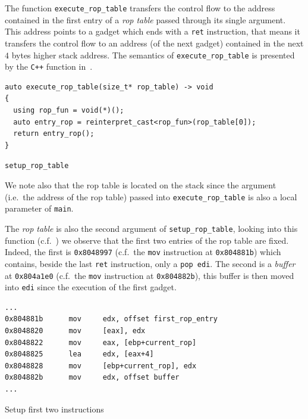 \documentclass{easychair}
\begin{document}
The function \texttt{execute\_rop\_table} transfers the control flow to the address contained in the first entry of a \emph{rop table} passed through its single argument. This address points to a gadget which ends with a \texttt{ret} instruction, that means it transfers the control flow to an address (of the next gadget) contained in the next $4$ bytes higher stack address. The semantics of \texttt{execute\_rop\_table} is presented by the \texttt{C++} function in~.

\begin{listing}[ht]
  \begin{tcolorbox}
\begin{verbatim}
auto execute_rop_table(size_t* rop_table) -> void
{
  using rop_fun = void(*)();
  auto entry_rop = reinterpret_cast<rop_fun>(rop_table[0]);
  return entry_rop();
}
\end{verbatim}
  \end{tcolorbox}
  \caption{\texttt{setup\_rop\_table}}
  \label{lst:setup_rop_table}
\end{listing}

\begin{remark}
  We note also that the rop table is located on the stack since the argument (i.e.~the address of the rop table) passed into \texttt{execute\_rop\_table} is also a local parameter of \texttt{main}.
\end{remark}

The \emph{rop table} is also the second argument of \texttt{setup\_rop\_table}, looking into this function (c.f.~) we observe that the first two entries of the rop table are fixed. Indeed, the first is \texttt{0x8048997} (c.f.~the \texttt{mov} instruction at \texttt{0x804881b}) which contains, beside the last \texttt{ret} instruction, only a \texttt{pop edi}. The second is a \emph{buffer} at \texttt{0x804a1e0} (c.f.~the \texttt{mov} instruction at \texttt{0x804882b}), this buffer is then moved into \texttt{edi} since the execution of the first gadget.

\begin{listing}
  \begin{verbatim}
...
0x804881b      mov     edx, offset first_rop_entry
0x8048820      mov     [eax], edx
0x8048822      mov     eax, [ebp+current_rop]
0x8048825      lea     edx, [eax+4]
0x8048828      mov     [ebp+current_rop], edx
0x804882b      mov     edx, offset buffer
...
  \end{verbatim}
  \caption{Setup first two instructions}
  \label{lst:setup_first_twos}
\end{listing}
\end{document}
